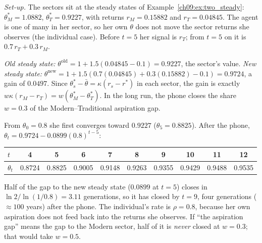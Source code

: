 \documentclass[../solutions_manual.tex]{subfiles}
\begin{document}
\emph{Set-up.} The sectors sit at the steady states of Example~\ref{ch09:ex:two_steady}: $\theta_M^* = 1.0882$, $\theta_T^* = 0.9227$, with returns $r_M = 0.15882$ and $r_T = 0.04845$. The agent is one of many in her sector, so her own $\theta$ does not move the sector returns she observes (the individual case). Before $t = 5$ her signal is $r_T$; from $t = 5$ on it is $0.7\,r_T + 0.3\,r_M$.

 \emph{Old steady state:} $\theta^{\text{old}} = 1 + 1.5(0.04845 - 0.1) = 0.9227$, the sector's value. \emph{New steady state:} $\theta^{\text{new}} = 1 + 1.5(0.7(0.04845) + 0.3(0.15882) - 0.1) = 0.9724$, a gain of $0.0497$. Since $\theta_s^* - \bar\theta = \kappa(r_s - r^*)$ in each sector, the gain is exactly $w\kappa(r_M - r_T) = w(\theta_M^* - \theta_T^*)$. In the long run, the phone closes the share $w = 0.3$ of the Modern--Traditional aspiration gap.

 From $\theta_0 = 0.8$ she first converges toward $0.9227$ ($\theta_5 = 0.8825$). After the phone, $\theta_t = 0.9724 - 0.0899(0.8)^{t-5}$:
\begin{center}
\begin{tabular}{lccccccccc}
\toprule
$t$ & 4 & 5 & 6 & 7 & 8 & 9 & 10 & 11 & 12 \\
\midrule
$\theta_t$ & 0.8724 & 0.8825 & 0.9005 & 0.9148 & 0.9263 & 0.9355 & 0.9429 & 0.9488 & 0.9535 \\
\bottomrule
\end{tabular}
\end{center}
Half of the gap to the new steady state ($0.0899$ at $t = 5$) closes in $\ln 2/\ln(1/0.8) = 3.11$ generations, so it has closed by $t = 9$, four generations ($\approx 100$ years) after the phone. The individual's rate is $\rho = 0.8$, because her own aspiration does not feed back into the returns she observes. If ``the aspiration gap'' means the gap to the Modern sector, half of it is \emph{never} closed at $w = 0.3$; that would take $w = 0.5$.
\end{document}
